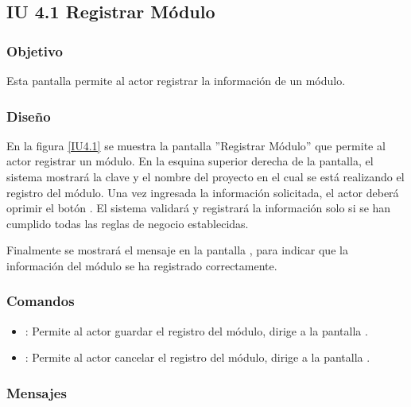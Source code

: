 \subsection{IU 4.1 Registrar Módulo}

\subsubsection{Objetivo}
	Esta pantalla permite al actor registrar la información de un módulo.
\subsubsection{Diseño}
	En la figura \ref{IU4.1} se muestra la pantalla ''Registrar Módulo'' que permite al actor registrar un módulo. En la esquina superior derecha de la pantalla, el sistema mostrará la clave y el nombre del proyecto en el cual se está realizando el registro del módulo.
	Una vez ingresada la información solicitada, el actor deberá oprimir el botón . El sistema validará y registrará la información solo si se han cumplido todas las reglas de negocio establecidas.
	
	Finalmente se mostrará el mensaje  en la pantalla , para indicar que la información del módulo se ha registrado correctamente.
\label{IU4.1}
\subsubsection{Comandos}
\begin{itemize}
	\item {}: Permite al actor guardar el registro del módulo, dirige a la pantalla .
	\item {}: Permite al actor cancelar el registro del módulo, dirige a la pantalla .
\end{itemize}

\subsubsection{Mensajes}

